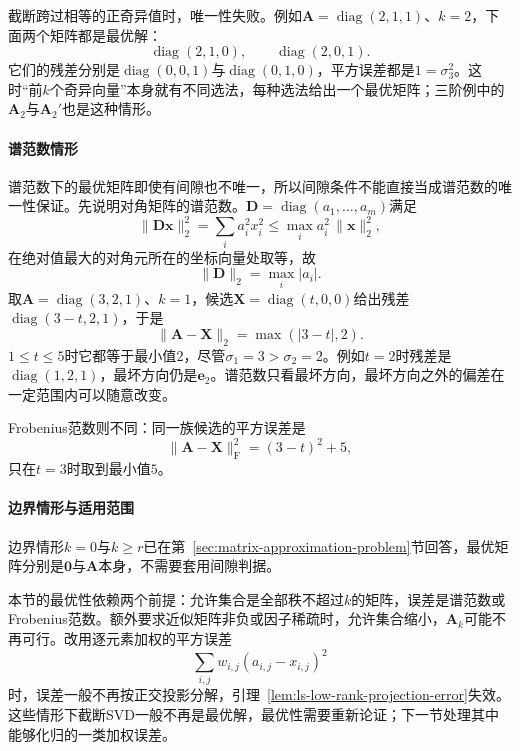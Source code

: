 截断跨过相等的正奇异值时，唯一性失败。例如$\bm A=\operatorname{diag}(2,1,1)$、$k=2$，下面两个矩阵都是最优解：
\[
 \operatorname{diag}(2,1,0),\qquad\operatorname{diag}(2,0,1).
\]
它们的残差分别是$\operatorname{diag}(0,0,1)$与$\operatorname{diag}(0,1,0)$，平方误差都是$1=\sigma_3^2$。这时“前$k$个奇异向量”本身就有不同选法，每种选法给出一个最优矩阵；三阶例中的$\bm A_2$与$\bm A_2'$也是这种情形。

\paragraph{谱范数情形}
谱范数下的最优矩阵即使有间隙也不唯一，所以间隙条件不能直接当成谱范数的唯一性保证。先说明对角矩阵的谱范数。$\bm D=\operatorname{diag}(a_1,\ldots,a_m)$满足
\[
 \lVert\bm D\bm x\rVert_2^2=\sum_ia_i^2x_i^2\leq\max_ia_i^2\,\lVert\bm x\rVert_2^2 ,
\]
在绝对值最大的对角元所在的坐标向量处取等，故
\[
 \lVert\bm D\rVert_2=\max_i\lvert a_i\rvert .
\]
取$\bm A=\operatorname{diag}(3,2,1)$、$k=1$，候选$\bm X=\operatorname{diag}(t,0,0)$给出残差$\operatorname{diag}(3-t,2,1)$，于是
\[
 \lVert\bm A-\bm X\rVert_2=\max(\lvert3-t\rvert,2).
\]
$1\leq t\leq5$时它都等于最小值$2$，尽管$\sigma_1=3>\sigma_2=2$。例如$t=2$时残差是$\operatorname{diag}(1,2,1)$，最坏方向仍是$\bm e_2$。谱范数只看最坏方向，最坏方向之外的偏差在一定范围内可以随意改变。

Frobenius范数则不同：同一族候选的平方误差是
\[
 \lVert\bm A-\bm X\rVert_{\mathrm F}^2=(3-t)^2+5 ,
\]
只在$t=3$时取到最小值$5$。

\paragraph{边界情形与适用范围}
边界情形$k=0$与$k\geq r$已在第~\ref{sec:matrix-approximation-problem}节回答，最优矩阵分别是$\bm0$与$\bm A$本身，不需要套用间隙判据。

本节的最优性依赖两个前提：允许集合是全部秩不超过$k$的矩阵，误差是谱范数或Frobenius范数。额外要求近似矩阵非负或因子稀疏时，允许集合缩小，$\bm A_k$可能不再可行。改用逐元素加权的平方误差
\[
 \sum_{i,j}w_{i,j}(a_{i,j}-x_{i,j})^2
\]
时，误差一般不再按正交投影分解，引理~\ref{lem:ls-low-rank-projection-error}失效。这些情形下截断SVD一般不再是最优解，最优性需要重新论证；下一节处理其中能够化归的一类加权误差。
